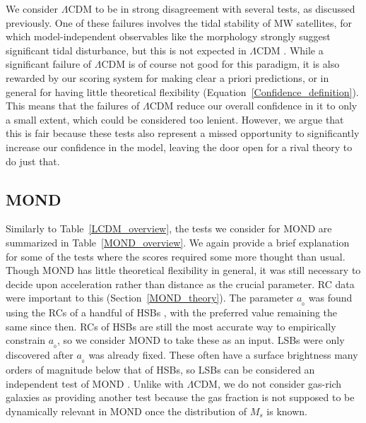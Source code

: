 \documentclass[fleqn,usenatbib,useAMS]{mnras} %
\begin{document}
We consider $\Lambda$CDM to be in strong disagreement with several tests, as discussed previously. One of these failures involves the tidal stability of MW satellites, for which model-independent observables like the morphology strongly suggest significant tidal disturbance, but this is not expected in $\Lambda$CDM \citep{McGaugh_Wolf_2010}. While a significant failure of $\Lambda$CDM is of course not good for this paradigm, it is also rewarded by our scoring system for making clear a priori predictions, or in general for having little theoretical flexibility (Equation~\ref{Confidence_definition}). This means that the failures of $\Lambda$CDM reduce our overall confidence in it to only a small extent, which could be considered too lenient. However, we argue that this is fair because these tests also represent a missed opportunity to significantly increase our confidence in the model, leaving the door open for a rival theory to do just that.



\subsection{MOND}
\label{MOND_comparison_section}

Similarly to Table~\ref{LCDM_overview}, the tests we consider for MOND are summarized in Table~\ref{MOND_overview}. We again provide a brief explanation for some of the tests where the scores required some more thought than usual. Though MOND has little theoretical flexibility in general, it was still necessary to decide upon acceleration rather than distance as the crucial parameter. RC data were important to this (Section~\ref{MOND_theory}). The parameter $a_{_0}$ was found using the RCs of a handful of HSBs \citep{Begeman_1991}, with the preferred value remaining the same since then. RCs of HSBs are still the most accurate way to empirically constrain $a_{_0}$, so we consider MOND to take these as an input. LSBs were only discovered after $a_{_0}$ was already fixed. These often have a surface brightness many orders of magnitude below that of HSBs, so LSBs can be considered an independent test of MOND \citep{McGaugh_1998}. Unlike with $\Lambda$CDM, we do not consider gas-rich galaxies as providing another test because the gas fraction is not supposed to be dynamically relevant in MOND once the distribution of $M_s$ is known.
\end{document}
